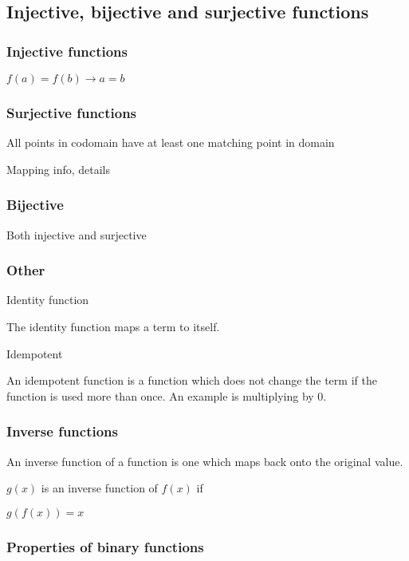 
\subsection{Injective, bijective and surjective functions}

\subsubsection{Injective functions}

\(f(a)=f(b)\rightarrow a=b\)

\subsubsection{Surjective functions}

All points in codomain have at least one matching point in domain

Mapping info, details

\subsubsection{Bijective}

Both injective and surjective

\subsubsection{Other}

Identity function

The identity function maps a term to itself.

Idempotent

An idempotent function is a function which does not change the term if the function is used more than once. An example is multiplying by \(0\).

\subsubsection{Inverse functions}

An inverse function of a function is one which maps back onto the original value.

\(g(x)\) is an inverse function of \(f(x)\) if	

\(g(f(x))=x\)

\subsubsection{Properties of binary functions}

